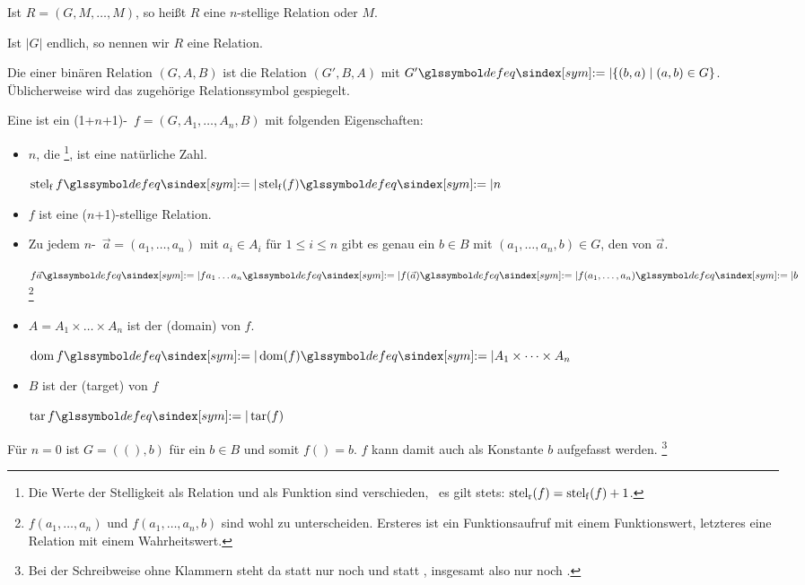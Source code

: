 \begin{description}
	Ist $R=(G,M,\dots,M)$, so heißt $R$ eine $n$-stellige Relation  oder  $M$.

	Ist $|G|$ endlich, so nennen wir $R$ eine  Relation.

	\item [\Umkehrrelation] Die  einer binären Relation $(G,A,B)$ ist die Relation $(G',B,A)$ mit $G' \symdefeq \{(b,a)\mid(a,b) \in G\}$.
	Üblicherweise wird das zugehörige Relationssymbol gespiegelt.

	\item [\Funktion] Eine  ist ein (1+$n$+1)-\Tupel\ $f = (G,A_1,\dots,A_n,B)$ mit folgenden Eigenschaften:
	\begin{itemize}
		\item $n$, die %
		\footnote{%
			Die Werte der Stelligkeit als Relation und als Funktion sind verschieden, \textdh\ es gilt stets: $\operatorname*{stel_r}(f) = \operatorname*{stel_f}(f) + 1$.
		},
		ist eine natürliche Zahl.

		$\stelfunc f \symdefeq \stelfunc(f) \symdefeq n$

		\item $f$ ist eine ($n$+1)-stellige Relation.

		\item Zu jedem $n$-\Tupel\ $\vec{a} = (a_1,\dots,a_n)$ mit $a_i \in A_i$ für $1 \le i \le n$ gibt es genau ein $b \in B$ mit $(a_1,\dots,a_n,b) \in G$, den  von $\vec{a}$.

		$f\vec{a} \symdefeq f a_1 \dots a_n \symdefeq f(\vec{a}) \symdefeq f(a_1,\dots,a_n) \symdefeq b$
		\footnote{%
			$f(a_1,\dots,a_n)$ und $f(a_1,\dots,a_n,b)$ sind wohl zu unterscheiden.
			Ersteres ist ein Funktionsaufruf mit einem Funktionswert, letzteres eine Relation mit einem Wahrheitswert.
		}

		\item $A = A_1 \times \dots \times A_n$ ist der  (domain) von $f$.

		$\Db f \symdefeq \Db(f) \symdefeq A_1 \times \dots \times A_n$

		\item $B$ ist der  (target) von $f$

		$\Zb f \symdefeq \Zb(f)$
	\end{itemize}
	Für $n = 0$ ist $G = ((),b)$ für ein $b \in B$ und somit $f() = b$. $f$ kann damit auch als Konstante $b$ aufgefasst werden.%
	\footnote{%
		Bei der Schreibweise ohne Klammern steht da statt  nur noch  und statt , insgesamt also nur noch .
	}


\end{description}
